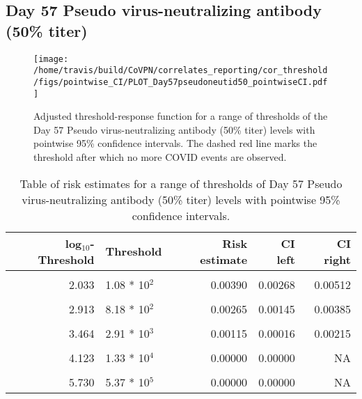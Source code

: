 \documentclass[]{book}
\theoremstyle{definition}
\theoremstyle{definition}
\theoremstyle{definition}
\newcommand{\1}{\mathbbm{1}}
\begin{document}
\clearpage

\clearpage

\clearpage

\hypertarget{day-57-pseudo-virus-neutralizing-antibody-50-titer}{%
\subsection{Day 57 Pseudo virus-neutralizing antibody (50\% titer)}\label{day-57-pseudo-virus-neutralizing-antibody-50-titer}}

\begin{figure}[H]
\centering
\texttt{[image: /home/travis/build/CoVPN/correlates\_reporting/cor\_threshold/figs/pointwise\_CI/PLOT\_Day57pseudoneutid50\_pointwiseCI.pdf]}
\caption{Adjusted threshold-response function for a range of thresholds of the
  Day 57 Pseudo virus-neutralizing antibody (50\% titer) levels with pointwise 95\% confidence intervals. The dashed red line marks the threshold after which no more COVID events are observed. }
\end{figure}
\begin{table}[!h]

\caption{\label{tab:unnamed-chunk-351}Table of risk estimates for a range of thresholds of Day 57 Pseudo virus-neutralizing antibody (50\% titer) levels with pointwise 95\% confidence intervals.}
\centering
\begin{tabular}[t]{rlrrr}
\toprule
log$_{10}$-Threshold & Threshold & Risk estimate & CI left & CI right\\
\midrule
\cellcolor{gray!6}{0.699} & \cellcolor{gray!6}{5.00 * 10$^0$} & \cellcolor{gray!6}{0.00508} & \cellcolor{gray!6}{0.00376} & \cellcolor{gray!6}{0.00639}\\
2.033 & 1.08 * 10$^2$ & 0.00390 & 0.00268 & 0.00512\\
\cellcolor{gray!6}{2.447} & \cellcolor{gray!6}{2.80 * 10$^2$} & \cellcolor{gray!6}{0.00347} & \cellcolor{gray!6}{0.00223} & \cellcolor{gray!6}{0.00471}\\
2.913 & 8.18 * 10$^2$ & 0.00265 & 0.00145 & 0.00385\\
\cellcolor{gray!6}{3.196} & \cellcolor{gray!6}{1.57 * 10$^3$} & \cellcolor{gray!6}{0.00235} & \cellcolor{gray!6}{0.00112} & \cellcolor{gray!6}{0.00358}\\
3.464 & 2.91 * 10$^3$ & 0.00115 & 0.00016 & 0.00215\\
\cellcolor{gray!6}{3.736} & \cellcolor{gray!6}{5.45 * 10$^3$} & \cellcolor{gray!6}{0.00134} & \cellcolor{gray!6}{0.00013} & \cellcolor{gray!6}{0.00255}\\
4.123 & 1.33 * 10$^4$ & 0.00000 & 0.00000 & NA\\
\cellcolor{gray!6}{4.629} & \cellcolor{gray!6}{4.26 * 10$^4$} & \cellcolor{gray!6}{0.00000} & \cellcolor{gray!6}{0.00000} & \cellcolor{gray!6}{NA}\\
5.730 & 5.37 * 10$^5$ & 0.00000 & 0.00000 & NA\\
\bottomrule
\end{tabular}
\end{table}
\end{document}
